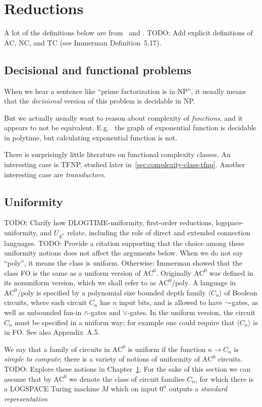 \chapter{Reductions}
\label{chap:reductions}
A lot of the definitions below are from~\cite{10.5555/520668} and \cite{Immerman1999-IMMDC}.
TODO: Add explicit definitions of $\text{AC}$, $\text{NC}$, and $\text{TC}$ (see Immerman Definition~5.17).


\section{Decisional and functional problems}
When we hear a sentence like ``prime factorization is in NP'', it usually
means that the \emph{decisional} version of this problem is decidable in NP.

But we actually usually want to reason about complexity of \emph{functions},
and it appears to not be equivalent. E.g. \ the graph of exponential function is 
decidable in polytime, but calculating exponential function is not.

There is surprisingly little literature on functional complexity classes.
An interesting case is TFNP, studied later in~\ref{sec:complexity-class-tfnp}.
Another interesting case are \emph{transductors}.

\section{Uniformity}
TODO: Clarify how DLOGTIME-uniformity, first-order reductions, logspace-uniformity, and $U_{E^*}$ relate, including the role of direct and extended connection languages.
TODO: Provide a citation supporting that the choice among these uniformity notions does not affect the arguments below.
When we do not say ``poly'', it means the class is uniform. Otherwise: Immerman showed that the class FO is the same as a uniform version
of $\text{AC}^0$. Originally $\text{AC}^0$ was defined in its nonuniform version, which
we shall refer to as $\text{AC}^0/\text{poly}$. A language in $\text{AC}^0/\text{poly}$ is specified by
a polynomial size bounded depth family $\langle C_n \rangle$ of Boolean circuits, where
each circuit $C_n$ has $n$ input bits, and is allowed to have $\neg$-gates, as well as
unbounded fan-in $\land$-gates and $\lor$-gates. In the uniform version, the circuit
$C_n$ must be specified in a uniform way; for example one could require that
$\langle C_n \rangle$ is in FO\@. See also Appendix~A.5.

We say that a family of circuits in $\text{AC}^0$ is uniform if the function $n \rightarrow C_n$ is
\emph{simple to compute}; there is a variety of notions of uniformity of $\text{AC}^0$ circuits.
TODO: Explore these notions in Chapter~\ref{chap:reductions}. For the sake of this section we can assume
that by $\text{AC}^0$ we denote the class of circuit families $C_n$, for which there is a 
LOGSPACE Turing machine $M$ which on input $0^n$ outputs a \emph{standard representation}


